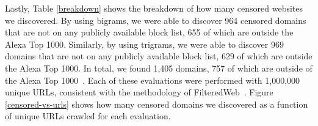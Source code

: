Lastly, Table \ref{breakdown} shows the breakdown of how many censored
websites we discovered. By using bigrams, we were able to discover 964
censored domains that are not on any publicly available block list,
655 of which are outside the Alexa Top 1000. Similarly, by using
trigrams, we were able to discover 969 domains that are not on any
publicly available block list, 629 of which are outside the Alexa Top
1000. In total, we found 1,405 domains, 757 of which are outside of
the Alexa Top 1000~\cite{alexa:top1000}. Each of these evaluations
were performed with 1,000,000 unique URLs, consistent with the
methodology of FilteredWeb~\cite{darer2017filteredweb}. Figure \ref{censored-vs-urls} shows how
many censored domains we discovered as a function of unique URLs
crawled for each evaluation.


